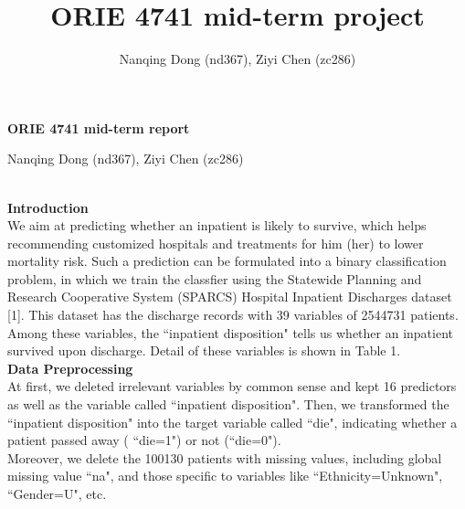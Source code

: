 \documentclass[a4paper]{article}
\author{Nanqing Dong (nd367), Ziyi Chen (zc286)}
\title{ORIE 4741 mid-term project}
\begin{document}

\centerline
{\LARGE \textbf{ORIE 4741 mid-term report}}
\centerline
{\large Nanqing Dong (nd367), Ziyi Chen (zc286)}
~\\
\noindent
\textbf{\large Introduction\\}
\indent
We aim at predicting whether an inpatient is likely to survive, which helps recommending customized hospitals and treatments for him (her) to lower mortality risk. Such a prediction can be formulated into a binary classification problem, in which we train the classfier using the Statewide Planning and Research Cooperative System (SPARCS) Hospital Inpatient Discharges dataset [1]. This dataset has the discharge records with 39 variables of 2544731 patients. Among these variables, the ``inpatient disposition" tells us whether an inpatient survived upon discharge. Detail of these variables is shown in Table 1.\\

\noindent
\textbf{\large Data Preprocessing\\}
\indent
At first, we deleted irrelevant variables by common sense and kept 16 predictors as well as the variable called ``inpatient disposition". Then, we transformed the ``inpatient disposition" into the target variable called ``die", indicating whether a patient passed away ( ``die=1") or not (``die=0").\\
\indent
Moreover, we delete the 100130 patients with missing values, including global missing value ``na", and those specific to variables like ``Ethnicity=Unknown", ``Gender=U", etc.\\
\end{document}
